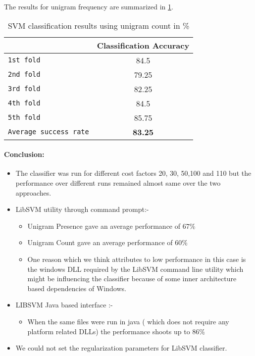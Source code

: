 \documentclass[paper=a4, fontsize=11pt]{scrartcl}
\numberwithin{equation}{section}		%
\numberwithin{figure}{section}			%
\numberwithin{table}{section}				%
\begin{document}
The results for unigram frequency are summarized in \ref{table:svm_uniC}.
\begin {table}[H]
\centering
\begin{tabular}{ |l||c|}
\hline
&{\bf Classification Accuracy}  \\ \hline
\texttt{1st fold} & 84.5  \\ \hline
\texttt{2nd fold} & 79.25 \\ \hline
\texttt{3rd fold} & 82.25 \\ \hline
\texttt{4th fold} & 84.5\\\hline
\texttt{5th fold} & 85.75 \\ \hline
\texttt{Average success rate} & {\bf 83.25}  \\ \hline
\end{tabular}
\caption{SVM classification results using unigram count in \%} 
\label{table:svm_uniC}
\end {table}
 
\paragraph{Conclusion:}
\begin{itemize}
\item The classifier was run for different cost factors 20, 30, 50,100 and 110 but the performance over different runs remained almost same over the two approaches.
\item LibSVM utility through command prompt:-
	\begin{itemize}
    \item Unigram Presence gave an average performance of 67\%
	\item Unigram Count gave an average performance of 60\%
	\item One reason which we think attributes to low performance in this case is the windows DLL required by the LibSVM command line utility which might be influencing the classifier because of some inner architecture based dependencies of Windows.
	\end{itemize}
\item LIBSVM Java based interface :-
	\begin{itemize}
	\item When the same files were run in java ( which does not require any platform related DLLs) the performance shoots up to 86\%
	\end{itemize}
    \item We could not set the regularization parameters for LibSVM classifier.
\end{itemize}
\end{document}
